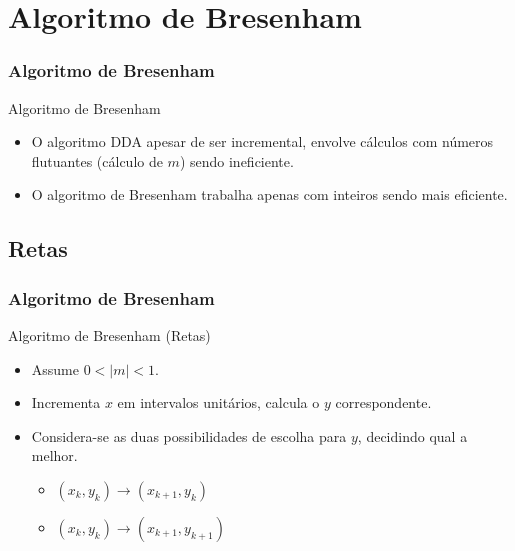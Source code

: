 \documentclass{beamer}
\begin{document}
\section{Algoritmo de Bresenham}
\begin{frame}
\frametitle{Algoritmo de Bresenham}

		\begin{block}{Algoritmo de Bresenham}
		\begin{itemize}
			\item O algoritmo DDA apesar de ser incremental, envolve cálculos com números flutuantes (cálculo de $m$) sendo ineficiente.
			\item O algoritmo de Bresenham trabalha apenas com inteiros sendo mais eficiente.
		\end{itemize}
	\end{block}
\end{frame}

\subsection{Retas}
\begin{frame}
\frametitle{Algoritmo de Bresenham}

		\begin{block}{Algoritmo de Bresenham (Retas)}
		\begin{itemize}
			\item Assume $ 0 < |m| < 1$.
			\item Incrementa $x$ em intervalos unitários, calcula o $y$ correspondente.
			\item Considera-se as duas possibilidades de escolha para $y$, decidindo qual a melhor.
			\begin{itemize}
				\item $(x_k,y_k) \to (x_{k+1},y_k)$
				\item $(x_k,y_k) \to (x_{k+1},y_{k+1})$
			\end{itemize}
		\end{itemize}
	\end{block}
\end{frame}
\end{document}
